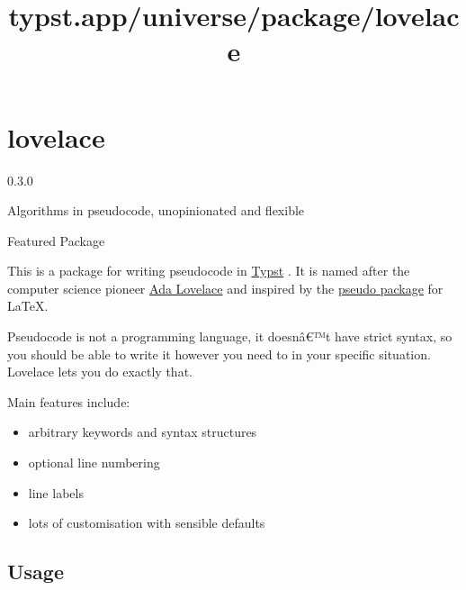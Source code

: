 \title{typst.app/universe/package/lovelace}

\label{banner}
\section{lovelace}\label{lovelace}

{ 0.3.0 }

Algorithms in pseudocode, unopinionated and flexible

{ } Featured Package

\label{readme}
This is a package for writing pseudocode in
\href{https://typst.app/}{Typst} . It is named after the computer
science pioneer \href{https://en.wikipedia.org/wiki/Ada_Lovelace}{Ada
Lovelace} and inspired by the \href{https://ctan.org/pkg/pseudo}{pseudo
package} for LaTeX.


Pseudocode is not a programming language, it doesnâ€™t have strict
syntax, so you should be able to write it however you need to in your
specific situation. Lovelace lets you do exactly that.

Main features include:

\begin{itemize}
\tightlist
\item
  arbitrary keywords and syntax structures
\item
  optional line numbering
\item
  line labels
\item
  lots of customisation with sensible defaults
\end{itemize}

\subsection{Usage}\label{usage}

